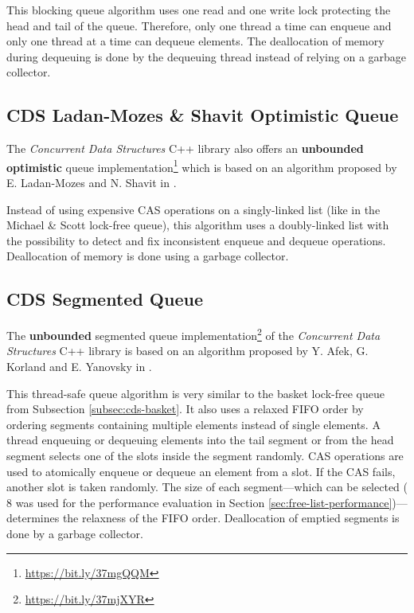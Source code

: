 	This blocking queue algorithm uses one read and one write lock protecting the head and tail of the queue. Therefore, only one thread a time can enqueue and only one thread at a time can dequeue elements. The deallocation of memory during dequeuing is done by the dequeuing thread instead of relying on a garbage collector.

\subsection[CDS OptimisticQueue]{CDS Ladan-Mozes \& Shavit Optimistic Queue} \label{subsec:cds-optimistic}

	The \textit{Concurrent Data Structures} C++ library also offers an \textbf{unbounded} \textbf{optimistic} queue implementation\footnote{\url{https://bit.ly/37mgQQM}} which is based on an algorithm proposed by E. Ladan-Mozes and N. Shavit in \cite{Ladan-Mozes:2004}.
	
	Instead of using expensive CAS operations on a singly-linked list (like in the Michael \& Scott lock-free queue), this algorithm uses a doubly-linked list with the possibility to detect and fix inconsistent enqueue and dequeue operations. Deallocation of memory is done using a garbage collector.

\subsection[CDS SegmentedQueue]{CDS Segmented Queue} \label{subsec:cds-segmented}

	The \textbf{unbounded} segmented queue implementation\footnote{\url{https://bit.ly/37mjXYR}} of the \textit{Concurrent Data Structures} C++ library is based on an algorithm proposed by Y. Afek, G. Korland and E. Yanovsky in \cite{Afek:2010}.
	
	This thread-safe queue algorithm is very similar to the basket lock-free queue from Subsection \ref{subsec:cds-basket}. It also uses a relaxed FIFO order by ordering segments containing multiple elements instead of single elements. A thread enqueuing or dequeuing elements into the tail segment or from the head segment selects one of the slots inside the segment randomly. CAS operations are used to atomically enqueue or dequeue an element from a slot. If the CAS fails, another slot is taken randomly. The size of each segment---which can be selected ($8$ was used for the performance evaluation in Section \ref{sec:free-list-performance})---determines the relaxness of the FIFO order. Deallocation of emptied segments is done by a garbage collector.


